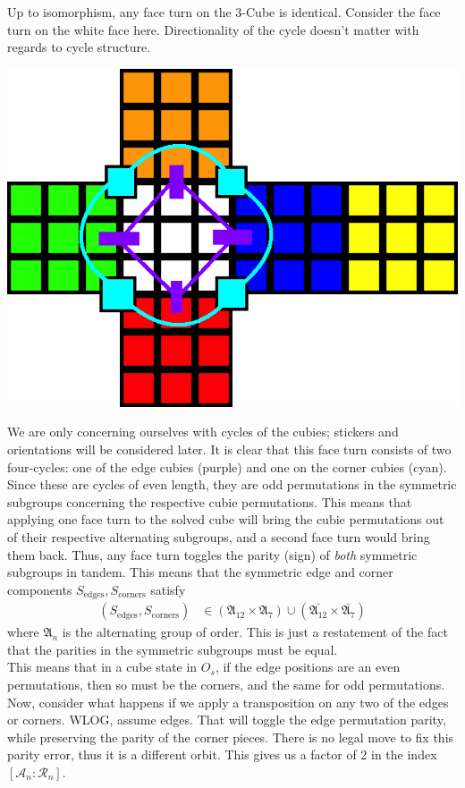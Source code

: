 \documentclass[10pt,letterpaper]{report}
\begin{document}
Up to isomorphism, any face turn on the 3-Cube is identical.  Consider the face turn on the white face here.  Directionality of the cycle doesn't matter with regards to cycle structure.
\begin{center}
\includegraphics[scale=.5]{images/faceCubieCycle.png} 
\end{center}
We are only concerning ourselves with cycles of the cubies; stickers and orientations will be considered later.  It is clear that this face turn consists of two four-cycles: one of the edge cubies (purple) and one on the corner cubies (cyan).  Since these are cycles of even length, they are odd permutations in the symmetric subgroups concerning the respective cubie permutations.  This means that applying one face turn to the solved cube will bring the cubie permutations out of their respective alternating subgroups, and a second face turn would bring them back.  Thus, any face turn toggles the parity (sign) of \textit{both} symmetric subgroups in tandem.  This means that the symmetric edge and corner components $S_{\text{edges}}, S_{\text{corners}}$ satisfy
\begin{align*}
(S_{\text{edges}},S_{\text{corners}})
&\in
(\mathfrak{A}_{12} \times \mathfrak{A}_7)
\cup
(\bar{\mathfrak{A}_{12}} \times \bar{\mathfrak{A}_7})
\end{align*}
where $\mathfrak{A}_n$ is the alternating group of order.  This is just a restatement of the fact that the parities in the symmetric subgroups must be equal. \\

This means that in a cube state in $O_s$, if the edge positions are an even permutations, then so must be the corners, and the same for odd permutations.  Now, consider what happens if we apply a transposition on any two of the edges or corners.  WLOG, assume edges.  That will toggle the edge permutation parity, while preserving the parity of the corner pieces.  There is no legal move to fix this parity error, thus it is a different orbit.  This gives us a factor of 2 in the index $[\mathcal{A}_n : \mathcal{R}_n]$. \\
\end{document}
